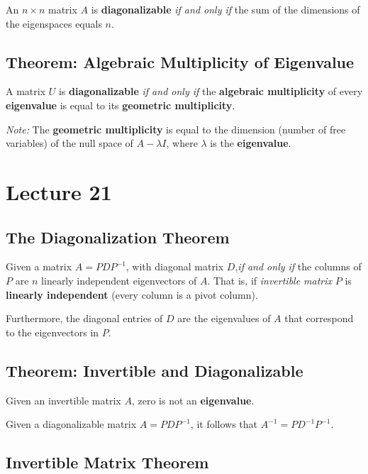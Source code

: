 \documentclass[12pt, letterpaper]{article}
\begin{document}
  An $ n \times n $ matrix $ A $ is \textbf{diagonalizable}
  \textit{if and only if} the sum of the dimensions of the
  eigenspaces equals $ n $.

  \subsection*{Theorem: Algebraic Multiplicity of Eigenvalue}

  A matrix $ U $ is \textbf{diagonalizable} \textit{if and only if}
  the \textbf{algebraic multiplicity} of every \textbf{eigenvalue} is
  equal to its \textbf{geometric multiplicity}.
  \bigskip

  \textit{Note:} The \textbf{geometric multiplicity} is equal to the
  dimension (number of free variables) of the null space of $ A -
  \lambda I $, where $ \lambda $ is the \textbf{eigenvalue}.

  \section*{Lecture 21}

  \subsection*{The Diagonalization Theorem}

  Given a matrix $ A = PDP^{-1} $, with diagonal matrix $ D
  $,\textit{if and only if} the columns of $ P $ are $ n $ linearly
  independent eigenvectors of $ A $. That is, if \textit{invertible
  matrix} $ P $ is \textbf{linearly independent} (every column is a
  pivot column).
  \medskip

  Furthermore, the diagonal entries of $ D $ are the eigenvalues of $
  A $ that correspond to the eigenvectors in $ P $.
  \medskip

  \subsection*{Theorem: Invertible and Diagonalizable}

  Given an invertible matrix $ A $, zero is not an \textbf{eigenvalue}.
  \medskip

  Given a diagonalizable matrix $ A = PDP^{-1} $, it follows that $
  A^{-1} = PD^{-1}P^{-1} $.

  \subsection*{Invertible Matrix Theorem}
\end{document}
